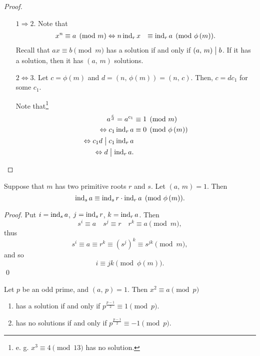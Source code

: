 \begin{proof}
    \begin{enumerate}
        \item[$1 \Rightarrow 2$.] Note that
        \begin{align*}
            x^n &\equiv a \pmod{m}
            \Leftrightarrow n \operatorname{\mathrm{ind}}_r x &\equiv \operatorname{\mathrm{ind}}_r a \pmod{\phi\left(m\right)}.
        \end{align*} 
        Recall that $ax \equiv b \pmod{m}$ has a solution if and only if $\left(a,\,m\right)\bigm| b$.
        If it has a solution, then it has $\left(a,\,m\right)$ solutions.
        \item[$2 \Leftrightarrow 3$.] Let $c = \phi\left(m\right)$ and $d=\left(n,\,\phi\left(m\right)\right)=\left(n,\,c\right)$.
        Then, $c = dc_1$ for some $c_1$.
        
        Note that\footnote{
            e. g. $x^3 \equiv 4 \pmod{13}$ has no solution.
        }
        \begin{align*}
            a^{\frac{c}{d}} = a^{c_1} &\equiv 1 \pmod{m} \\
            \Leftrightarrow c_1 \operatorname{\mathrm{ind}}_r a &\equiv 0 \pmod{\phi\left(m\right)} \\
            \Leftrightarrow c_1d \bigm| c_1 \operatorname{\mathrm{ind}}_r a \\
            \Leftrightarrow d \bigm| \operatorname{\mathrm{ind}}_r a.
        \end{align*}
    \end{enumerate}
\end{proof}

\begin{note}
    Suppose that $m$ has two primitive roots $r$ and $s$. Let $\left(a,\,m\right)=1$.
    Then
     \[
        \operatorname{\mathrm{ind}}_s a \equiv \operatorname{\mathrm{ind}}_s r \cdot \operatorname{\mathrm{ind}}_r a \pmod{\phi\left(m\right)}.
    \]
\end{note}

\begin{proof}
    Put $i=\operatorname{\mathrm{ind}}_s a$, $j=\operatorname{\mathrm{ind}}_s r$, $k=\operatorname{\mathrm{ind}}_r a$. Then
    \[
        s^i \equiv a \quad s^j \equiv r \quad r^k \equiv a \pmod{m},
    \]
    thus
    \[
        s^i \equiv a \equiv r^k \equiv \left(s^j\right)^k \equiv s^{jk} \pmod{m},
    \]
    and so
    \[
        i \equiv jk \pmod{\phi\left(m\right)}.
    \]\qed
\end{proof}

\begin{theorem}
    Let $p$ be an odd prime, and $\left(a,\,p\right)=1$. Then
    $x^2 \equiv a \pmod{p}$
    \begin{enumerate}
        \item has a solution if and only if $p^{\frac{p-1}{2}}\equiv 1 \pmod{p}$.
        \item has no solutions if and only if $p^{\frac{p-1}{2}}\equiv -1 \pmod{p}$.
    \end{enumerate}
\end{theorem}

